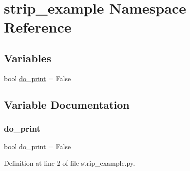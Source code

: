 \hypertarget{namespacestrip__example}{}\section{strip\+\_\+example Namespace Reference}
\label{namespacestrip__example}
\subsection*{Variables}
\begin{DoxyCompactItemize}
\item 
bool \hyperlink{namespacestrip__example_a3fbde670e51e79a4d7dfdc5d1cd07da2}{do\+\_\+print} = False
\end{DoxyCompactItemize}


\subsection{Variable Documentation}
\mbox{\label{namespacestrip__example_a3fbde670e51e79a4d7dfdc5d1cd07da2}} 
\subsubsection{\texorpdfstring{do\+\_\+print}{do\_print}}
{\footnotesize\ttfamily bool do\+\_\+print = False}



Definition at line 2 of file strip\+\_\+example.\+py.


